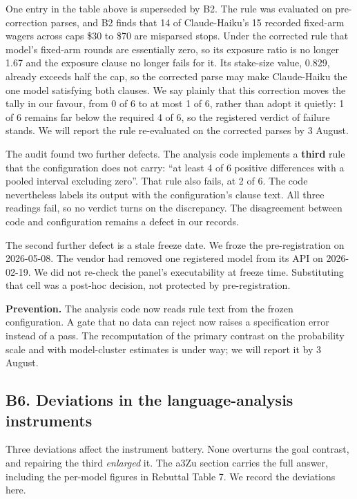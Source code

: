 One entry in the table above is superseded by B2. The rule was evaluated on pre-correction
parses, and B2 finds that 14 of Claude-Haiku's 15 recorded fixed-arm wagers across caps \$30 to
\$70 are misparsed stops. Under the corrected rule that model's fixed-arm rounds are essentially
zero, so its exposure ratio is no longer 1.67 and the exposure clause no longer fails for it.
Its stake-size value, 0.829, already exceeds half the cap, so the corrected parse may make
Claude-Haiku the one model satisfying both clauses. We say plainly that this correction moves
the tally in our favour, from 0 of 6 to at most 1 of 6, rather than adopt it quietly: 1 of 6
remains far below the required 4 of 6, so the registered verdict of failure stands. We will
report the rule re-evaluated on the corrected parses by 3 August.

The audit found two further defects. The analysis code implements a \textbf{third} rule that the
configuration does not carry: ``at least 4 of 6 positive differences with a pooled interval
excluding zero''. That rule also fails, at 2 of 6. The code nevertheless labels its output with
the configuration's clause text. All three readings fail, so no verdict turns on the discrepancy.
The disagreement between code and configuration remains a defect in our records.

The second further defect is a stale freeze date. We froze the pre-registration on 2026-05-08. The
vendor had removed one registered model from its API on 2026-02-19. We did not re-check the panel's
executability at freeze time. Substituting that cell was a post-hoc decision, not protected by
pre-registration.

\textbf{Prevention.} The analysis code now reads rule text from the frozen configuration. A gate
that no data can reject now raises a specification error instead of a pass. The recomputation of
the primary contrast on the probability scale and with model-cluster estimates is under way; we
will report it by 3 August.


\subsection*{B6. Deviations in the language-analysis instruments}

Three deviations affect the instrument battery. None overturns the goal contrast, and repairing
the third \emph{enlarged} it. The a3Zu section carries the full answer, including the per-model
figures in Rebuttal Table 7. We record the deviations here.

